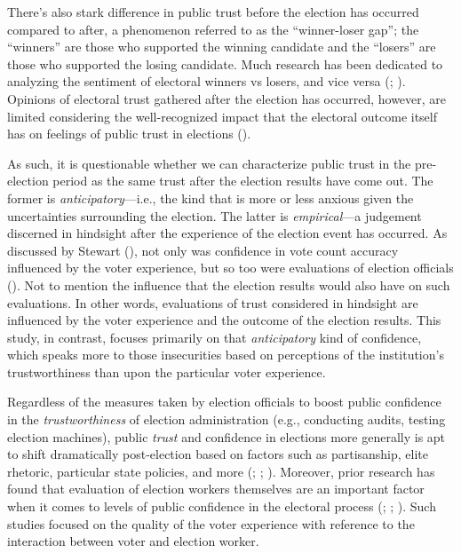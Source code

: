 \documentclass[
  12pt,
  letterpaper,
]{article}
\begin{document}
There's also stark difference in public trust before the election has
occurred compared to after, a phenomenon referred to as the
``winner-loser gap''; the ``winners'' are those who supported the
winning candidate and the ``losers'' are those who supported the losing
candidate. Much research has been dedicated to analyzing the sentiment
of electoral winners vs losers, and vice versa
(;
). Opinions of electoral
trust gathered after the election has occurred, however, are limited
considering the well-recognized impact that the electoral outcome itself
has on feelings of public trust in elections
().

As such, it is questionable whether we can characterize public trust in
the pre-election period as the same trust after the election results
have come out. The former is \emph{anticipatory}---i.e., the kind that
is more or less anxious given the uncertainties surrounding the
election. The latter is \emph{empirical}---a judgement discerned in
hindsight after the experience of the election event has occurred. As
discussed by Stewart (), not only was
confidence in vote count accuracy influenced by the voter experience,
but so too were evaluations of election officials
(). Not to mention the
influence that the election results would also have on such evaluations.
In other words, evaluations of trust considered in hindsight are
influenced by the voter experience and the outcome of the election
results. This study, in contrast, focuses primarily on that
\emph{anticipatory} kind of confidence, which speaks more to those
insecurities based on perceptions of the institution's trustworthiness
than upon the particular voter experience.

Regardless of the measures taken by election officials to boost public
confidence in the \emph{trustworthiness} of election administration
(e.g., conducting audits, testing election machines), public
\emph{trust} and confidence in elections more generally is apt to shift
dramatically post-election based on factors such as partisanship, elite
rhetoric, particular state policies, and more
(;
;
). Moreover, prior
research has found that evaluation of election workers themselves are an
important factor when it comes to levels of public confidence in the
electoral process (;
;
).
Such studies focused on the quality of the voter experience with
reference to the interaction between voter and election worker.
\end{document}
